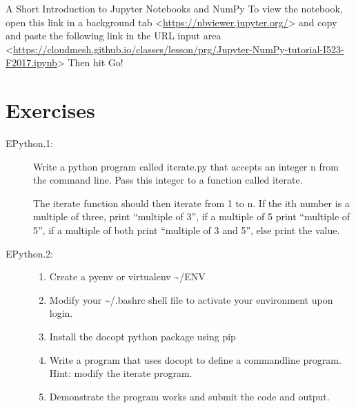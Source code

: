 A Short Introduction to Jupyter Notebooks and NumPy To view the
notebook, open this link in a background tab
\textless{}\url{https://nbviewer.jupyter.org/}\textgreater{} and copy
and paste the following link in the URL input area
\textless{}\url{https://cloudmesh.github.io/classes/lesson/prg/Jupyter-NumPy-tutorial-I523-F2017.ipynb}\textgreater{}
Then hit Go!

\section{Exercises}\label{exercises}

\begin{description}
\item[EPython.1:]
Write a python program called iterate.py that accepts an integer n from
the command line. Pass this integer to a function called iterate.

The iterate function should then iterate from 1 to n. If the ith number
is a multiple of three, print ``multiple of 3'', if a multiple of 5
print ``multiple of 5'', if a multiple of both print ``multiple of 3 and
5'', else print the value.
\item[EPython.2:]
\begin{enumerate}
\tightlist
\item
  Create a pyenv or virtualenv \textasciitilde{}/ENV
\item
  Modify your \textasciitilde{}/.bashrc shell file to activate your
  environment upon login.
\item
  Install the docopt python package using pip
\item
  Write a program that uses docopt to define a commandline program.
  Hint: modify the iterate program.
\item
  Demonstrate the program works and submit the code and output.
\end{enumerate}
\end{description}
